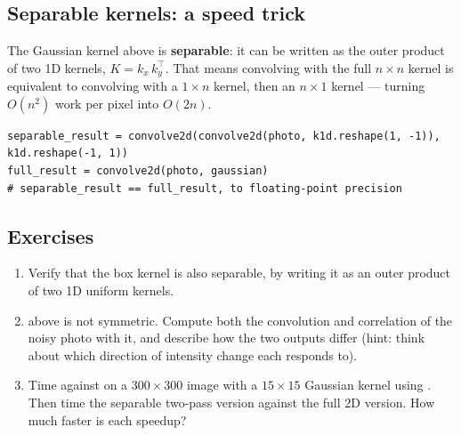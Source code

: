 \subsection*{Separable kernels: a speed trick}

The Gaussian kernel above is \textbf{separable}: it can be written as the outer product of two 1D kernels, $K=k_x\,k_y^\top$. That means convolving with the full $n\times n$ kernel is equivalent to convolving with a $1\times n$ kernel, then an $n\times1$ kernel --- turning $O(n^2)$ work per pixel into $O(2n)$.

\begin{lstlisting}
separable_result = convolve2d(convolve2d(photo, k1d.reshape(1, -1)), k1d.reshape(-1, 1))
full_result = convolve2d(photo, gaussian)
# separable_result == full_result, to floating-point precision
\end{lstlisting}

\subsection*{Exercises}
\begin{enumerate}
  \item Verify that the box kernel is also separable, by writing it as an outer product of two 1D uniform kernels.
  \item {} above is not symmetric. Compute both the convolution and correlation of the noisy photo with it, and describe how the two outputs differ (hint: think about which direction of intensity change each responds to).
  \item Time  against  on a $300\times300$ image with a $15\times15$ Gaussian kernel using . Then time the separable two-pass version against the full 2D version. How much faster is each speedup?
\end{enumerate}

\vfill
{}
